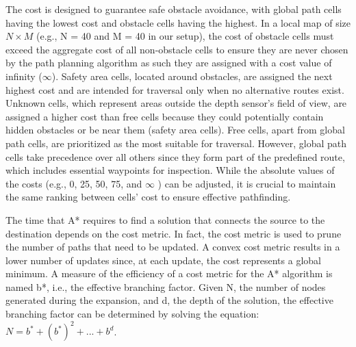 
The cost is designed to guarantee safe obstacle avoidance, with global path cells having the lowest cost and obstacle cells having the highest. 
In a local map of size  $N\times M$  (e.g.,  N = 40  and  M = 40  in our setup), the cost of obstacle cells must exceed the aggregate cost of all non-obstacle cells to ensure they are never chosen by the path planning algorithm as such they are assigned with a cost value of infinity ($\infty$).
Safety area cells, located around obstacles, are assigned the next highest cost and are intended for traversal only when no alternative routes exist.  
Unknown cells, which represent areas outside the depth sensor’s field of view, are assigned a higher cost than free cells because they could potentially contain hidden obstacles or be near them (safety area cells). 
Free cells, apart from global path cells, are prioritized as the most suitable for traversal. 
However, global path cells take precedence over all others since they form part of the predefined route, which includes essential waypoints for inspection.
While the absolute values of the costs (e.g., 0, 25, 50, 75, and  $\infty$ ) can be adjusted, it is crucial to maintain the same ranking between cells' cost to ensure effective pathfinding.

The time that A* requires to find a solution that connects the source to the destination depends on the cost metric.
In fact, the cost metric is used to prune the number of paths that need to be updated.
A convex cost metric results in a lower number of updates since, at each update, the cost represents a global minimum.
A measure of the efficiency of a cost metric for the A* algorithm is named b*, i.e., the effective branching factor.
Given N, the number of nodes generated during the expansion, and d, the depth of the solution, the effective branching factor can be determined by solving the equation: $N=b^*+(b^*)^2+...+b^d$.


